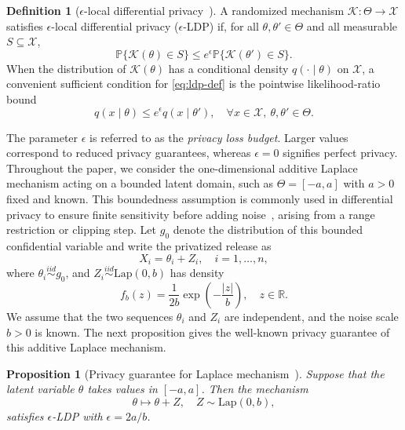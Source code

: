\documentclass[english, 11pt]{article}
\theoremstyle{plain}
\newtheorem{proposition}[theorem]{Proposition}
\theoremstyle{definition}
\newtheorem{definition}[theorem]{Definition}
\theoremstyle{remark}
\begin{document}
\begin{definition}[$\epsilon$-local differential privacy~\citep{duchi2013local}]
A randomized mechanism $\mathcal K:\Theta\to\mathcal X$ satisfies $\epsilon$-local differential privacy ($\epsilon$-LDP) if, for all $\theta,\theta'\in\Theta$ and all measurable $S\subseteq\mathcal X$,
\begin{equation}\label{eq:ldp-def}
\mathbb{P}\{\mathcal K(\theta)\in S\}\le e^\epsilon \mathbb{P}\{\mathcal K(\theta')\in S\}.
\end{equation}
When the distribution of $\mathcal K(\theta)$ has a conditional density $q(\cdot\mid\theta)$ on $\mathcal X$, a convenient sufficient condition for \eqref{eq:ldp-def} is the pointwise likelihood-ratio bound
\begin{equation*}
q(x\mid\theta)\le e^\epsilon q(x\mid\theta'),
\quad \forall x\in\mathcal X,\ \theta,\theta'\in\Theta.
\end{equation*}
\end{definition}
The parameter $\epsilon$ is referred to as the \textit{privacy loss budget}. Larger values correspond to reduced privacy guarantees, whereas $\epsilon=0$ signifies perfect privacy.
Throughout the paper, we consider the one-dimensional additive Laplace mechanism acting on a bounded latent domain, such as $\Theta = [-a,a]$ with $a>0$ fixed and known.
This boundedness assumption is commonly used in differential privacy to ensure finite sensitivity before adding noise~\citep{dwork2006differential,duchi2013local,duchi2018minimax}, arising from a range restriction or clipping step. 
Let $g_0$ denote the distribution of this bounded confidential variable and write the privatized release as
\begin{equation}\label{eq:model}
X_i=\theta_i+Z_i,\quad i=1,\dots,n,
\end{equation}
where $\theta_i \overset{iid}{\sim} g_0$, and $Z_i \overset{iid}{\sim} \mathrm{Lap}(0,b)$ has density
\begin{equation}\label{eq:laplace-density}
f_b(z)=\frac{1}{2b}\exp \left(-\frac{|z|}{b}\right),\quad z\in\mathbb R.
\end{equation}
We assume that the two sequences $\theta_i$ and $Z_i$ are independent, and the noise scale $b>0$ is known.
The next proposition gives the well-known privacy guarantee of this additive Laplace mechanism.

\begin{proposition}[Privacy guarantee for Laplace mechanism~\citep{dwork2006differential}]\label{prop:laplace-ldp}
Suppose that the latent variable $\theta$ takes values in $[-a,a]$. Then the mechanism
\begin{equation*}
\theta\mapsto \theta+Z,\quad Z\sim\mathrm{Lap}(0,b),
\end{equation*}
satisfies $\epsilon$-LDP with $\epsilon={2a}/{b}$. 
\end{proposition}
\end{document}
